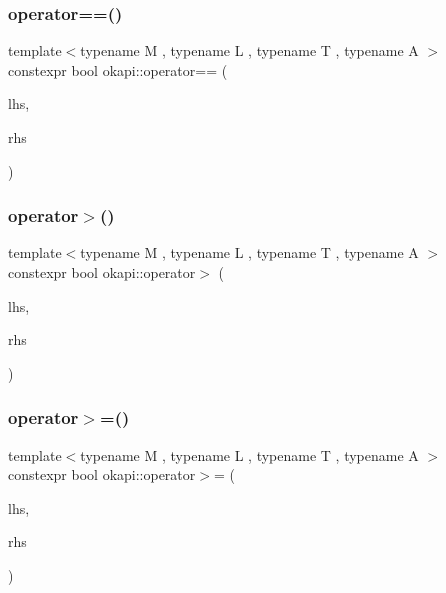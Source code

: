 \mbox{\label{namespaceokapi_a3f9de8ffeea76c6c278256cb1124ed83}} 
\subsubsection{\texorpdfstring{operator==()}{operator==()}}
{\footnotesize\ttfamily template$<$typename M , typename L , typename T , typename A $>$ \\
constexpr bool okapi\+::operator== (\begin{DoxyParamCaption}\item[{const \mbox{\hyperlink{classokapi_1_1RQuantity}{R\+Quantity}}$<$ M, L, T, A $>$ \&}]{lhs,  }\item[{const \mbox{\hyperlink{classokapi_1_1RQuantity}{R\+Quantity}}$<$ M, L, T, A $>$ \&}]{rhs }\end{DoxyParamCaption})}

\mbox{\label{namespaceokapi_a6fa2a8add20e9524b5f46e98645c98f4}} 
\subsubsection{\texorpdfstring{operator$>$()}{operator>()}}
{\footnotesize\ttfamily template$<$typename M , typename L , typename T , typename A $>$ \\
constexpr bool okapi\+::operator$>$ (\begin{DoxyParamCaption}\item[{const \mbox{\hyperlink{classokapi_1_1RQuantity}{R\+Quantity}}$<$ M, L, T, A $>$ \&}]{lhs,  }\item[{const \mbox{\hyperlink{classokapi_1_1RQuantity}{R\+Quantity}}$<$ M, L, T, A $>$ \&}]{rhs }\end{DoxyParamCaption})}

\mbox{\label{namespaceokapi_ae0ea83af0f730da0cb8045e2798b14ca}} 
\subsubsection{\texorpdfstring{operator$>$=()}{operator>=()}}
{\footnotesize\ttfamily template$<$typename M , typename L , typename T , typename A $>$ \\
constexpr bool okapi\+::operator$>$= (\begin{DoxyParamCaption}\item[{const \mbox{\hyperlink{classokapi_1_1RQuantity}{R\+Quantity}}$<$ M, L, T, A $>$ \&}]{lhs,  }\item[{const \mbox{\hyperlink{classokapi_1_1RQuantity}{R\+Quantity}}$<$ M, L, T, A $>$ \&}]{rhs }\end{DoxyParamCaption})}

